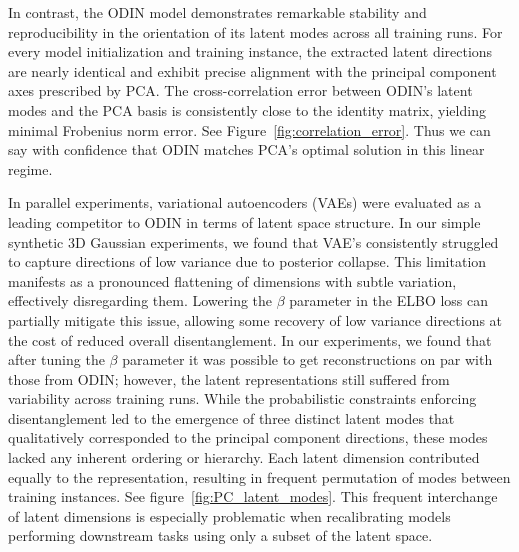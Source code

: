 \documentclass[twoside,11pt]{article}
\begin{document}
In contrast, the ODIN model demonstrates remarkable stability and reproducibility in the orientation of its latent modes across all training runs. For every model initialization and training instance, the extracted latent directions are nearly identical and exhibit precise alignment with the principal component axes prescribed by PCA. The cross-correlation error between ODIN's latent modes and the PCA basis is consistently close to the identity matrix, yielding minimal Frobenius norm error. See Figure~\ref{fig:correlation_error}. Thus we can say with confidence that ODIN matches PCA’s optimal solution in this linear regime.

In parallel experiments, variational autoencoders (VAEs) were evaluated as a leading competitor to ODIN in terms of latent space structure. In our simple synthetic 3D Gaussian experiments, we found that VAE's consistently struggled to capture directions of low variance due to posterior collapse. This limitation manifests as a pronounced flattening of dimensions with subtle variation, effectively disregarding them. Lowering the $\beta$ parameter in the ELBO loss can partially mitigate this issue, allowing some recovery of low variance directions at the cost of reduced overall disentanglement. In our experiments, we found that after tuning the $\beta$ parameter it was possible to get reconstructions on par with those from ODIN; however, the latent representations still suffered from variability across training runs. While the probabilistic constraints enforcing disentanglement led to the emergence of three distinct latent modes that qualitatively corresponded to the principal component directions, these modes lacked any inherent ordering or hierarchy. Each latent dimension contributed equally to the representation, resulting in frequent permutation of modes between training instances. See figure~\ref{fig:PC_latent_modes}. This frequent interchange of latent dimensions is especially problematic when recalibrating models performing downstream tasks using only a subset of the latent space.
\end{document}
